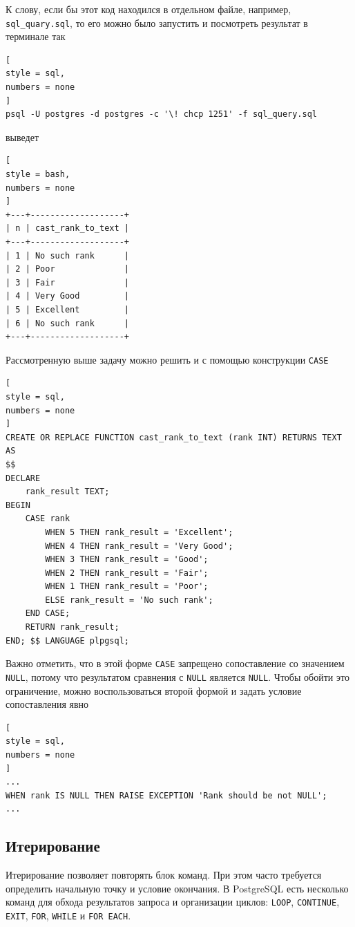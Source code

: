 \documentclass[%
	11pt,
	a4paper,
	utf8,
		]{article}
\begin{document}
К слову, если бы этот код находился в отдельном файле, например, \texttt{sql\_quary.sql}, то его можно было запустить и посмотреть результат в терминале так
\begin{lstlisting}[
style = sql,
numbers = none
]
psql -U postgres -d postgres -c '\! chcp 1251' -f sql_query.sql
\end{lstlisting}
выведет
\begin{lstlisting}[
style = bash,
numbers = none
]
+---+-------------------+
| n | cast_rank_to_text |
+---+-------------------+
| 1 | No such rank      |
| 2 | Poor              |
| 3 | Fair              |
| 4 | Very Good         |
| 5 | Excellent         |
| 6 | No such rank      |
+---+-------------------+
\end{lstlisting}

Рассмотренную выше задачу можно решить и с помощью конструкции \texttt{CASE}
\begin{lstlisting}[
style = sql,
numbers = none
]
CREATE OR REPLACE FUNCTION cast_rank_to_text (rank INT) RETURNS TEXT AS
$$
DECLARE
    rank_result TEXT;
BEGIN
    CASE rank
        WHEN 5 THEN rank_result = 'Excellent';
        WHEN 4 THEN rank_result = 'Very Good';
        WHEN 3 THEN rank_result = 'Good';
        WHEN 2 THEN rank_result = 'Fair';
        WHEN 1 THEN rank_result = 'Poor';
        ELSE rank_result = 'No such rank';
    END CASE;
    RETURN rank_result;
END; $$ LANGUAGE plpgsql;
\end{lstlisting}

Важно отметить, что в этой форме \texttt{CASE} запрещено сопоставление со значением \texttt{NULL}, потому что результатом сравнения с \texttt{NULL} является \texttt{NULL}. Чтобы обойти это ограничение, можно воспользоваться второй формой и задать условие сопоставления явно
\begin{lstlisting}[
style = sql,
numbers = none
]
...
WHEN rank IS NULL THEN RAISE EXCEPTION 'Rank should be not NULL';
...
\end{lstlisting}

\subsection{Итерирование}

Итерирование позволяет повторять блок команд. При этом часто требуется определить начальную точку и условие окончания. В PostgreSQL есть несколько команд для обхода результатов запроса и организации циклов: \texttt{LOOP}, \texttt{CONTINUE}, \texttt{EXIT}, \texttt{FOR}, \texttt{WHILE} и \texttt{FOR EACH}.
\end{document}
